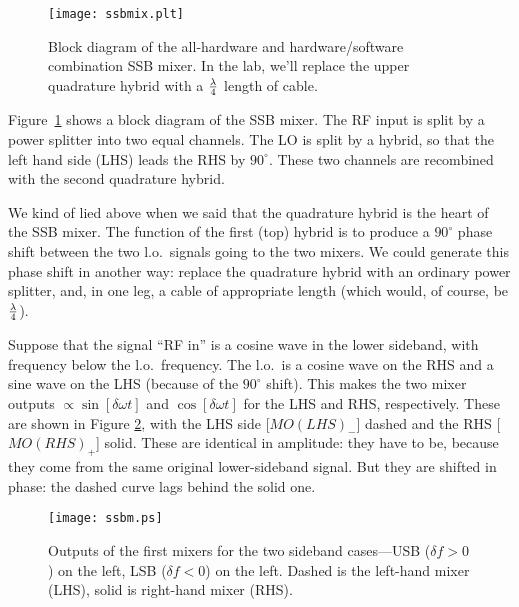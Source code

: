 \documentclass[11pt,preprint]{aastex}
\begin{document}
\begin{figure}[ht]
        \begin{center}
        \leavevmode
        \texttt{[image: ssbmix.plt]}
        \end{center}
        \caption{Block diagram of the all-hardware and
                hardware/software combination SSB mixer. In the lab,
                we'll replace the upper quadrature hybrid with a
                $\lambda \over 4$ length of cable.}\label{ssbmfig}
\end{figure}

Figure\ \ref{ssbmfig} shows a block diagram of the SSB mixer.  The RF
input is split by a power splitter into two equal channels. The LO is
split by a hybrid, so that the left hand side (LHS) leads the RHS by
$90^\circ$.  These two channels are recombined with the second
quadrature hybrid.

We kind of lied above when we said that the quadrature hybrid is the
heart of the SSB mixer. The function of the first (top) hybrid is to
produce a $90^\circ$ phase shift between the two l.o.\ signals going to
the two mixers. We could generate this phase shift in another way:
replace the quadrature hybrid with an ordinary power splitter, and, in
one leg, a cable of appropriate length (which would, of course, be
$\lambda \over 4$).

        Suppose that the signal ``RF in'' is a cosine wave in the lower
sideband, with frequency below the l.o.\ frequency. The l.o.\ is a
cosine wave on the RHS and a sine wave on the LHS (because of the
$90^\circ$ shift). This makes the two mixer outputs
$\propto \sin [\delta \omega t]$ and $\cos [\delta \omega t]$ for the
LHS and RHS, respectively. These are shown in Figure \ref{mixerout},
with the LHS side [$MO(LHS)_-$] dashed and the RHS [$MO(RHS)_+$]
solid. These are identical in amplitude: they have to be, because they
come from the same original lower-sideband signal. But they are shifted
in phase: the dashed curve lags behind the solid one.

\begin{figure}[h]
\hspace{-0.5in}
        \texttt{[image: ssbm.ps]}
        \caption{Outputs of the first mixers for the two sideband
	  cases---USB ($\delta f > 0$) on the left, LSB ($\delta f< 0$) on
	  the left.  Dashed is the left-hand mixer (LHS), solid is
	  right-hand mixer (RHS).
\label{mixerout}}
\end{figure}
\end{document}
